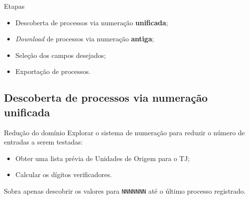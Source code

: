 \begin{frame}{Etapas}
    \begin{itemize}
        \item Descoberta de processos via numeração \textbf{unificada};
        \item \textit{Download} de processos via numeração \textbf{antiga};
        \item Seleção dos campos desejados;
        \item Exportação de processos.
    \end{itemize}
\end{frame}

\subsection{Descoberta de processos via numeração unificada}

\begin{frame}{Redução do domínio}
    Explorar o sistema de numeração para reduzir o número de entradas a serem testadas:

    \vspace{1ex}

    \begin{itemize}
        \item Obter uma lista prévia de Unidades de Origem para o TJ;
        \item Calcular os dígitos verificadores.
    \end{itemize}

    \vspace{1ex}

    Sobra apenas descobrir os valores para \texttt{NNNNNNN} até o último
    processo registrado.
\end{frame}

